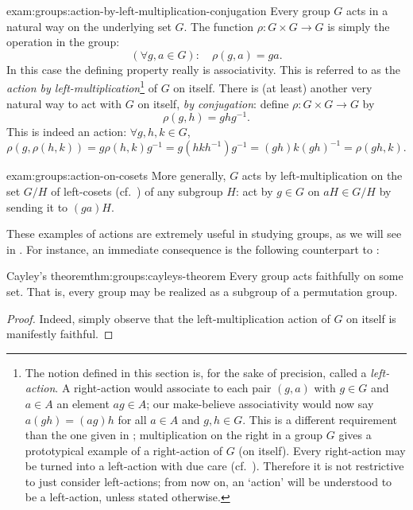 \begin{exam}{}{exam:groups:action-by-left-multiplication-conjugation}
  Every group $G$ acts in a natural way on the underlying set $G$. The
  function $\rho : G \times G \to G$ is simply the operation in the
  group:
  \[
    (\forall g, a \in G) : \quad \rho(g,a) = ga.
  \]
  In this case the defining property really is associativity. This is
  referred to as the \emph{action by left-multiplication}\footnote{The
    notion defined in this section is, for the sake of precision,
    called a \emph{left-action}. A right-action would associate to
    each pair $(g,a)$ with $g \in G$ and $a \in A$ an element
    $ag \in A$; our make-believe associativity would now say
    $a(gh) = (ag)h$ for all $a \in A$ and $g, h \in G$. This is a
    different requirement than the one given in
    ; multiplication on
    the right in a group $G$ gives a prototypical example of a
    right-action of $G$ (on itself). Every right-action may be turned
    into a left-action with due care (cf.\
    ).  Therefore it is not
    restrictive to just consider left-actions; from now on, an
    `action' will be understood to be a left-action, unless stated
    otherwise.} of $G$ on itself. There is (at least) another very
  natural way to act with $G$ on itself, \emph{by conjugation}: define
  $\rho : G \times G \to G$ by
  \[
    \rho(g,h) = ghg^{-1}.
  \]
  This is indeed an action: $\forall g, h, k \in G$,
  \[
    \rho(g, \rho(h,k)) = g\rho(h,k)g^{-1} = g(hkh^{-1})g^{-1} =
    (gh)k(gh)^{-1} = \rho(gh,k).
  \]
\end{exam}

\begin{exam}{}{exam:groups:action-on-cosets}
  More generally, $G$ acts by left-multiplication on the set $G/H$ of
  left-cosets (cf.\
  ) of any
  subgroup $H$: act by $g \in G$ on $aH \in G/H$ by sending it to
  $(ga)H$.
\end{exam}

These examples of actions are extremely useful in studying groups, as
we will see in . For instance, an immediate
consequence is the following counterpart to
\Cref{subsec:groups:presentations}:

\begin{thm}{Cayley's theorem}{thm:groups:cayleys-theorem}
  Every group acts faithfully on some
    set. That is, every group may be realized as a subgroup of a
    permutation group.
  \end{thm}
\begin{proof}
  Indeed, simply observe that the left-multiplication action of $G$ on
  itself is manifestly faithful.
\end{proof}

